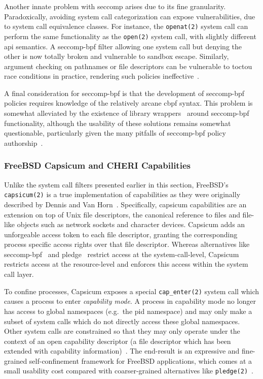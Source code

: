 \documentclass[
  fontsize=12pt,
  titlepage=firstiscover,
  paper=letter,
oneside,
  cleardoublepage=plain,
  parskip=half-,
  DIV=10,
  parindent,
  appendixprefix,
  chapterprefix,
  listof=totoc,
]{scrbook}
\begin{document}
Another innate problem with seccomp arises due to its fine granularity. Paradoxically,
avoiding system call categorization can expose vulnerabilities, due to system call
equivalence classes. For instance, the \texttt{openat(2)} system call can perform the same
functionality as the \texttt{open(2)} system call, with slightly different \gls{api} semantics.
A seccomp-bpf filter allowing one system call but denying the other is now totally broken
and vulnerable to sandbox escape.  Similarly, argument checking on pathnames or file
descriptors can be vulnerable to \gls{toctou} race conditions in practice, rendering such
policies ineffective~\cite{anderson2017_comparison}.

A final consideration for seccomp-bpf is that the development of seccomp-bpf policies
requires knowledge of the relatively arcane \gls{cbpf} syntax. This problem is somewhat
alleviated by the existence of library wrappers~\cite{libseccomp} around seccomp-bpf
functionality, although the usability of these solutions remains somewhat questionable,
particularly given the many pitfalls of seccomp-bpf policy
authorship~\cite{anderson2017_comparison}.

\subsubsection*{FreeBSD Capsicum and CHERI Capabilities}
\label{sss:capsicum}

Unlike the system call filters presented earlier in this section, FreeBSD's
\texttt{capsicum(2)} \cite{watson2010_capsicum, anderson2017_comparison} is a true
implementation of capabilities as they were originally described by Dennis and Van
Horn~\cite{dennis1966_semantics}. Specifically, capsicum capabilities are an extension on
top of Unix file descriptors, the canonical reference to files and file-like objects such
as network sockets and character devices. Capsicum adds an unforgeable access token to
each file descriptor, granting the corresponding process specific access rights over that
file descriptor. Whereas alternatives like seccomp-bpf~\cite{seccomp} and
pledge~\cite{pledge} restrict access at the system-call-level, Capsicum restricts access
at the resource-level and enforces this access within the system call layer.

To confine processes, Capsicum exposes a special \texttt{cap\_enter(2)} system call which
causes a process to enter \textit{capability mode}. A process in capability mode no longer
has access to global namespaces (e.g.\ the \gls{pid} namespace) and may only make a subset of
system calls which do not directly access these global namespaces. Other system calls are
constrained so that they may only operate under the context of an open capability
descriptor (a file descriptor which has been extended with capability
information)~\cite{watson2010_capsicum}. The end-result is an expressive and fine-grained
self-confinement framework for FreeBSD applications, which comes at a small usability cost
compared with coarser-grained alternatives like \texttt{pledge(2)}~\cite{pledge}.
\end{document}
